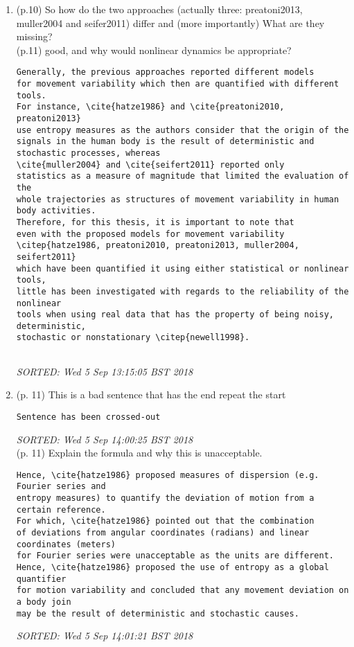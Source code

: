 \documentclass[10pt]{article}
\begin{document}
\begin{enumerate}[noitemsep,topsep=0pt]
\item (p.10) So how do the two approaches (actually three: preatoni2013, muller2004 and seifer2011) differ 
	and (more importantly) What are they missing? \\
	 (p.11) good, and why would nonlinear dynamics be appropriate?
\begin{verbatim}
Generally, the previous approaches reported different models 
for movement variability which then are quantified with different tools.
For instance, \cite{hatze1986} and \cite{preatoni2010, preatoni2013} 
use entropy measures as the authors consider that the origin of the 
signals in the human body is the result of deterministic and 
stochastic processes, whereas 
\cite{muller2004} and \cite{seifert2011} reported only
statistics as a measure of magnitude that limited the evaluation of the 
whole trajectories as structures of movement variability in human body activities.
Therefore, for this thesis, it is important to note that
even with the proposed models for movement variability 
\citep{hatze1986, preatoni2010, preatoni2013, muller2004, seifert2011} 
which have been quantified it using either statistical or nonlinear tools,
little has been investigated with regards to the reliability of the nonlinear 
tools when using real data that has the property of being noisy, deterministic,
stochastic or nonstationary \citep{newell1998}.


\end{verbatim}
\textit{
SORTED: Wed  5 Sep 13:15:05 BST 2018
}
\\







\item (p. 11) This is a bad sentence that has the end repeat the start 
\begin{verbatim}
Sentence has been crossed-out
\end{verbatim}
\textit{
SORTED: Wed  5 Sep 14:00:25 BST 2018
}
\\ (p. 11) Explain the formula and why this is unacceptable. 
\begin{verbatim}
Hence, \cite{hatze1986} proposed measures of dispersion (e.g. Fourier series and 
entropy measures) to quantify the deviation of motion from a certain reference.
For which, \cite{hatze1986} pointed out that the combination 
of deviations from angular coordinates (radians) and linear coordinates (meters)
for Fourier series were unacceptable as the units are different.
Hence, \cite{hatze1986} proposed the use of entropy as a global quantifier 
for motion variability and concluded that any movement deviation on a body join 
may be the result of deterministic and stochastic causes.
\end{verbatim}
\textit{
SORTED: Wed  5 Sep 14:01:21 BST 2018
}



\end{enumerate}
\end{document}
